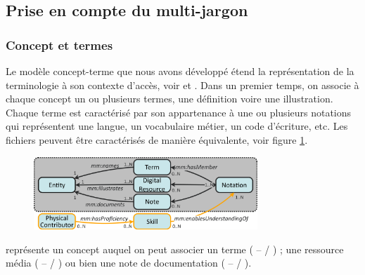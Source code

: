 





\subsection{Prise en compte du multi-jargon}\label{}

\subsubsection{Concept et termes}\label{sec:onter}
Le modèle concept-terme que nous avons développé étend la représentation de la terminologie à son contexte d'accès, voir \cite{Diemert2010} et \cite{Diemert2011a}. Dans un premier temps, on associe à chaque concept un ou plusieurs termes, une définition voire une illustration. Chaque terme est caractérisé par son appartenance à une ou plusieurs notations qui représentent une langue, un vocabulaire métier, un code d'écriture, etc. Les fichiers peuvent être caractérisés de manière équivalente, voir figure \ref{img:mj-ct}.


\begin{figure}[ht!]
\centering
\includegraphics[width=0.75\textwidth]{./images/MOD-TermConcept-v5a.png}
\caption{}
\label{img:mj-ct}
\end{figure}


	 représente un concept auquel on peut associer
		un terme ( --  / ) ; une ressource média ( --  / ) ou bien une note de documentation ( --  / ).

